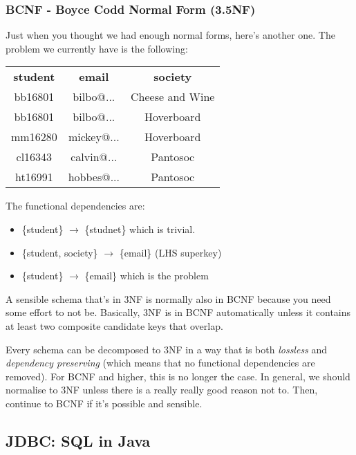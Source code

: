\documentclass[11pt,a4paper,titlepage,dvipsnames,cmyk]{scrartcl}
\begin{document}
\subsubsection{BCNF - Boyce Codd Normal Form (3.5NF)} 
\label{ssub:bcnf}

Just when you thought we had enough normal forms, here's another one. The
problem we currently have is the following:

\begin{center}
    \begin{tabular}{|c|c|c|}
        \hline
        \textbf{student} & \textbf{email} & \textbf{society} \\
        \hhline{|=|=|=|}
        bb16801 & bilbo@... & Cheese and Wine \\ \hline
        bb16801 & bilbo@... & Hoverboard \\ \hline
        mm16280 & mickey@... & Hoverboard \\ \hline
        cl16343 & calvin@... & Pantosoc \\ \hline
        ht16991 & hobbes@... & Pantosoc \\ \hline
    \end{tabular}
\end{center}

The functional dependencies are:
\begin{itemize}
    \item \{student\} $\rightarrow$ \{studnet\} which is trivial.
    \item \{student, society\} $\rightarrow$ \{email\} (LHS superkey)
    \item \{student\} $\rightarrow$ \{email\} which is the problem
\end{itemize}

A sensible schema that's in 3NF is normally also in BCNF because you need
some effort to not be. Basically, 3NF is in BCNF automatically unless it
contains at least two composite candidate keys that overlap. 

Every schema can be decomposed to 3NF in a way that is both
\textit{lossless} and \textit{dependency preserving} (which means that no
functional dependencies are removed). For BCNF and higher, this is no
longer the case. In general, we should normalise to 3NF unless there is a
really really good reason not to. Then, continue to BCNF if it's possible
and sensible.

\subsection{JDBC: SQL in Java}%
\label{sub: JDBC}
\end{document}
